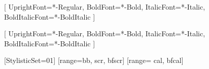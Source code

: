 
\setdefaultlanguage{english}

\setmainfont{Noto Serif}[
    UprightFont=*-Regular,
    BoldFont=*-Bold,
    ItalicFont=*-Italic,
    BoldItalicFont=*-BoldItalic
]

\setsansfont{Noto Sans}[
    UprightFont=*-Regular,
    BoldFont=*-Bold,
    ItalicFont=*-Italic,
    BoldItalicFont=*-BoldItalic
]

\setmonofont{Source Code Pro}




[StylisticSet={01}] %
[range={bb, scr, bfscr}]
[range= {cal, bfcal}]